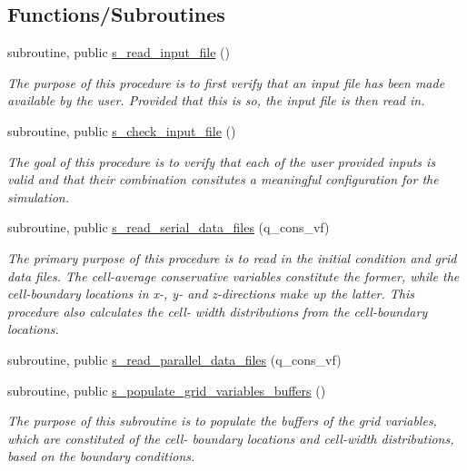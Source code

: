 \subsection*{Functions/\+Subroutines}
\begin{DoxyCompactItemize}
\item 
subroutine, public \hyperlink{namespacem__start__up_ae0571e78c0179c22d3811df31c33c321}{s\+\_\+read\+\_\+input\+\_\+file} ()
\begin{DoxyCompactList}\small\item\em The purpose of this procedure is to first verify that an input file has been made available by the user. Provided that this is so, the input file is then read in. \end{DoxyCompactList}\item 
subroutine, public \hyperlink{namespacem__start__up_ab5f7e03f1da1999ee699cec4f26370e0}{s\+\_\+check\+\_\+input\+\_\+file} ()
\begin{DoxyCompactList}\small\item\em The goal of this procedure is to verify that each of the user provided inputs is valid and that their combination consitutes a meaningful configuration for the simulation. \end{DoxyCompactList}\item 
subroutine, public \hyperlink{namespacem__start__up_abd3c3fd9fbb80ef2ddaf82945c1c1af9}{s\+\_\+read\+\_\+serial\+\_\+data\+\_\+files} (q\+\_\+cons\+\_\+vf)
\begin{DoxyCompactList}\small\item\em The primary purpose of this procedure is to read in the initial condition and grid data files. The cell-\/average conservative variables constitute the former, while the cell-\/boundary locations in x-\/, y-\/ and z-\/directions make up the latter. This procedure also calculates the cell-\/ width distributions from the cell-\/boundary locations. \end{DoxyCompactList}\item 
subroutine, public \hyperlink{namespacem__start__up_a45c8fef6680263063a1c7d2fa1748013}{s\+\_\+read\+\_\+parallel\+\_\+data\+\_\+files} (q\+\_\+cons\+\_\+vf)
\item 
subroutine, public \hyperlink{namespacem__start__up_afd813d91357dc4664a58c690e935ccbd}{s\+\_\+populate\+\_\+grid\+\_\+variables\+\_\+buffers} ()
\begin{DoxyCompactList}\small\item\em The purpose of this subroutine is to populate the buffers of the grid variables, which are constituted of the cell-\/ boundary locations and cell-\/width distributions, based on the boundary conditions. \end{DoxyCompactList}\item 

\end{DoxyCompactItemize}
